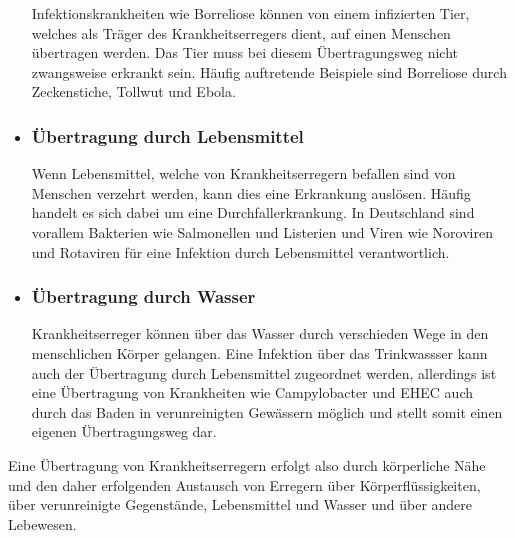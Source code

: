 \documentclass[12pt]{article}
\begin{document}
\begin{itemize}
    Infektionskrankheiten wie Borreliose können von einem infizierten Tier, welches als Träger des Krankheitserregers dient, auf einen Menschen übertragen werden. Das Tier muss bei diesem Übertragungsweg nicht zwangsweise erkrankt sein. Häufig auftretende Beispiele sind Borreliose durch Zeckenstiche, Tollwut und Ebola.
    \item \subsubsection{Übertragung durch Lebensmittel}
    Wenn Lebensmittel, welche von Krankheitserregern befallen sind von Menschen verzehrt werden, kann dies eine Erkrankung auslösen. Häufig handelt es sich dabei um eine Durchfallerkrankung. In Deutschland sind vorallem Bakterien wie Salmonellen und Listerien und Viren wie Noroviren und Rotaviren für eine Infektion durch Lebensmittel verantwortlich.
    \item \subsubsection{Übertragung durch Wasser}
    Krankheitserreger können über das Wasser durch verschieden Wege in den menschlichen Körper gelangen. Eine Infektion über das Trinkwassser kann auch der Übertragung durch Lebensmittel zugeordnet werden, allerdings ist eine Übertragung von Krankheiten wie Campylobacter und EHEC auch durch das Baden in verunreinigten Gewässern möglich und stellt somit einen eigenen Übertragungsweg dar.
\end{itemize}
Eine Übertragung von Krankheitserregern erfolgt also durch körperliche Nähe und den daher erfolgenden Austausch von Erregern über Körperflüssigkeiten, über verunreinigte Gegenstände, Lebensmittel und Wasser und über andere Lebewesen.
\end{document}
